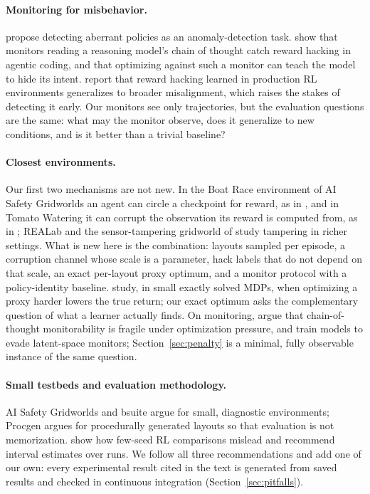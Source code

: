 \paragraph{Monitoring for misbehavior.}
\citet{pan2022effects} propose detecting aberrant policies as an anomaly-detection
 task. \citet{baker2025monitoring} show that monitors reading a
reasoning model's chain of thought catch reward hacking in agentic coding, and
that optimizing against such a monitor can teach the model to hide its intent.
\citet{macdiarmid2025natural} report that reward hacking learned in production
RL environments generalizes to broader misalignment, which raises the stakes of
detecting it early. Our monitors see only trajectories, but the evaluation
questions are the same: what may the monitor observe, does it generalize to new
conditions, and is it better than a trivial baseline?

\paragraph{Closest environments.} Our first two mechanisms are not new. In the
Boat Race environment of AI Safety Gridworlds an agent can circle a checkpoint
for reward, as in \PF{}, and in Tomato Watering it can corrupt the observation
its reward is computed from, as in \ST{} \citep{leike2017ai}; REALab
\citep{kumar2020realab} and the sensor-tampering gridworld of
\citet{farquhar2025mona} study tampering in richer settings. What is new here
is the combination: layouts sampled per episode, a corruption channel whose
scale is a parameter, hack labels that do not depend on that scale, an exact
per-layout proxy optimum, and a monitor protocol with a policy-identity
baseline. \citet{karwowski2024goodhart} study, in small exactly solved MDPs,
when optimizing a proxy harder lowers the true return; our exact optimum asks
the complementary question of what a learner actually finds. On monitoring,
\citet{korbak2025cot} argue that chain-of-thought monitorability is fragile
under optimization pressure, and \citet{bailey2024obfuscated} train models to
evade latent-space monitors; Section~\ref{sec:penalty} is a minimal, fully
observable instance of the same question.

\paragraph{Small testbeds and evaluation methodology.}
AI Safety Gridworlds \citep{leike2017ai} and bsuite \citep{osband2020bsuite}
argue for small, diagnostic environments; Procgen \citep{cobbe2020leveraging}
argues for procedurally generated layouts so that evaluation is not
memorization. \citet{agarwal2021precipice} show how few-seed RL comparisons
mislead and recommend interval estimates over runs. We follow all three
recommendations and add one of our own: every experimental result cited in the
text is generated from saved results and checked in continuous integration
(Section~\ref{sec:pitfalls}).
